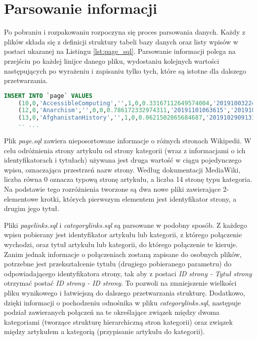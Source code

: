 \section{Parsowanie informacji}
\label{sec:data-parsing}
Po pobraniu i rozpakowaniu rozpoczyna się proces parsowania danych. Każdy z plików  składa się z definicji struktury tabeli bazy danych oraz listy wpisów w postaci ukazanej na Listingu \ref{lst:page_sql}. Parsowanie informacji polega na przejściu po każdej linijce danego pliku, wydostaniu kolejnych wartości następujących po wyrażeniu  i zapisaniu tylko tych, które są istotne dla dalszego przetwarzania.

\begin{lstlisting}[language=SQL,frame=single,caption={Fragment pliku enwiki-20191101-page.sql zawierający dane o stronach},label=lst:page_sql]
INSERT INTO `page` VALUES
    (10,0,'AccessibleComputing','',1,0,0.33167112649574004,'20191003224230','20190105021557',854851586,94,'wikitext',NULL),
    (12,0,'Anarchism','',0,0,0.786172332974311,'20191101063615','20191031183024',923631615,104479,'wikitext',NULL),
    (13,0,'AfghanistanHistory','',1,0,0.0621502865684687,'20191029091312','20190618192734',783865149,90,'wikitext',NULL),
    -- ...
\end{lstlisting}

Plik \textit{page.sql} zawiera nieposortowane informacje o różnych stronach Wikipedii. W celu odróżnienia strony artykułu od strony kategorii (wraz z informacjami o ich identyfikatorach i tytułach) używana jest druga wartość w ciągu pojedynczego wpisu, oznaczająca przestrzeń nazw strony. Według dokumentacji MediaWiki, liczba równa 0 oznacza typową stronę artykułu, a liczba 14 stronę typu kategoria. Na podstawie tego rozróżnienia tworzone są dwa nowe pliki zawierające 2-elementowe krotki, których pierwszym elementem jest identyfikator strony, a drugim jego tytuł.

Pliki \textit{pagelinks.sql} i \textit{categorylinks.sql} są parsowane w podobny sposób. Z każdego wpisu pobierany jest identyfikator artykułu lub kategorii, z którego połączenie wychodzi, oraz tytuł artykułu lub kategorii, do którego połączenie te kieruje. Zanim jednak informacje o połączeniach zostaną zapisane do osobnych plików, potrzebne jest przekształcenie tytułu (drugiego pobieranego parametru) do odpowiadającego identyfikatora strony, tak aby z postaci \textit{ID strony - Tytuł strony} otrzymać postać \textit{ID strony - ID strony}. To pozwoli na zmniejszenie wielkości pliku wynikowego i łatwiejszą do dalszego przetwarzania strukturę. Dodatkowo, dzięki informacji o pochodzeniu odnośnika w pliku \textit{categorylinks.sql}, następuje podział zawieranych połączeń na te określające związek między dwoma kategoriami (tworzące strukturę hierarchiczną stron kategorii) oraz związek między artykułem a kategorią (przypisanie artykułu do kategorii).

